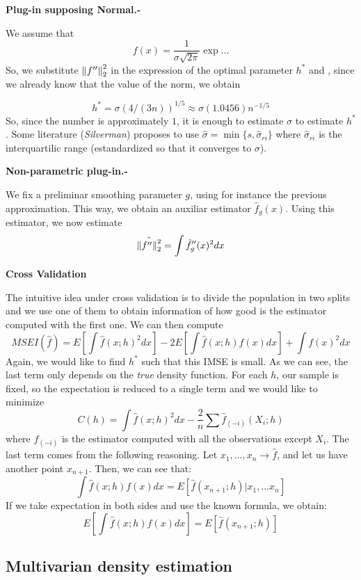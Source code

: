 \textbf{Plug-in supposing Normal.-}

We assume that
\[
f(x) = \frac{1}{\sigma \sqrt{2\pi}}\exp...
\]
So, we substitute \(\left\lVert f''\right\rVert_2^2\) in the expression of the optimal parameter \(h^*\) and , since we already know that the value of the norm, we obtain

\[
h^* = \sigma(4/(3n))^{1/5} \approx \sigma(1.0456)n^{-1/5}
\]
So, since the number is approximately \(1\), it is enough to estimate \(\sigma\) to estimate \(h^*\). Some literature (\emph{Silverman}) proposes to use \(\hat \sigma = \min \{ s,\hat\sigma_{ri}\}\) where \(\hat \sigma_{ri}\) is the interquartilic range (estandardized so that it converges to \(\sigma\)).


\textbf{Non-parametric plug-in.-}

We fix a preliminar smoothing parameter $g$, using for instance the previous approximation. This way, we obtain an auxiliar estimator \(\hat f_g (x) \). Using this estimator, we now estimate \[
\hat{\left\lVert f''\right\rVert_2^2} = \int \hat f_g ''(x)^2dx
  \]


  \textbf{ Cross Validation }

  The intuitive idea under cross validation is to divide the population in two splits and we use one of them to obtain information of how good is the estimator computed with the first one. We can then compute
  \[
MSEI(\hat f) = E \left[ \int \hat f (x;h)^2 dx\right] - 2E\left[ \int \hat f (x;h)f(x) dx \right] + \int f(x)^2 dx
  \]
  Again, we would like to find \(h^*\) such that this IMSE is small. As we can see, the last term only depends on the \emph{true} density function. For each \(h\), our sample is fixed, so the expectation is reduced to a single term and we would like to minimize
  \[
  C(h) =   \int \hat f (x;h)^2 dx - \frac{2}{n} \sum \hat f_{(-i)} (X_i;h)
  \]
  where \(f_{(-i)}\) is the estimator computed with all the observations except \(X_i\). The last term comes from the following reasoning. Let \(x_1,\dots,x_n \to \hat f\), and let us have another point \(x_{n+1}\). Then, we can see that:
  \[
  \int \hat f (x;h) f(x) dx = E \left[ \hat f (x_{n+1};h) | x_1,\dots x_n \right]
  \]
  If we take expectation in both sides and use the known formula, we obtain:
  \[
  E\left[ \int \hat f (x;h) f(x) dx\right] = E \left[ \hat f (x_{n+1};h) \right]
  \]


\subsection{Multivarian density estimation}

